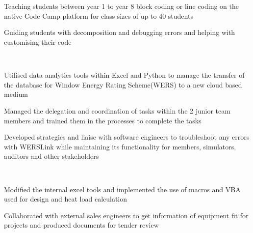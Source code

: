 \documentclass[11pt, a4paper]{MagicalCV}
\begin{document}
\begin{minipage}[t]{0.58\textwidth} 

\sectionsep \\ %
 \\
\vspace{\topsep} %
\begin{tightemize}
\item Teaching students between year 1 to year 8 block coding or line coding on the native Code Camp platform for class sizes of up to 40 students
\item Guiding students with decomposition and debugging errors and helping with customising their code
\end{tightemize}
\sectionsep

 \\
\vspace{\topsep} %
\begin{tightemize}
\item Utilised data analytics tools within Excel and Python to manage the transfer of the database for Window Energy Rating Scheme(WERS) to a new cloud based medium
\item Managed the delegation and coordination of tasks within the 2 junior team members and trained them in the processes to complete the tasks
\item Developed strategies and liaise with software engineers to troubleshoot any errors with WERSLink while maintaining its functionality for members, simulators, auditors and other stakeholders
\end{tightemize}
\sectionsep

 \\
\vspace{\topsep} %
\begin{tightemize}
\item Modified the internal excel tools and implemented the use of macros and VBA used for design and heat load calculation
\item Collaborated with external sales engineers to get information of equipment fit for projects and produced documents for tender review
\end{tightemize}
\sectionsep


\end{minipage}
\end{document}
